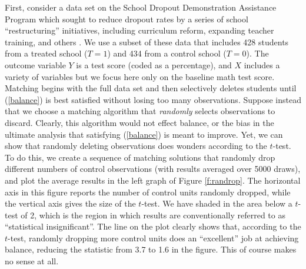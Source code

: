 \documentclass[11pt,titlepage]{article}
\begin{document}
First, consider a data set on the School Dropout Demonstration
Assistance Program which sought to reduce dropout rates by a series of
school ``restructuring'' initiatives, including curriculum reform,
expanding teacher training, and others \citep{AgoDyn04,Stuart04}.  We
use a subset of these data that includes 428 students from a treated
school ($T=1$) and 434 from a control school ($T=0$).  The outcome
variable $Y$ is a test score (coded as a percentage), and $X$ includes
a variety of variables but we focus here only on the baseline math
test score.  Matching begins with the full data set and then
selectively deletes students until (\ref{balance}) is best satisfied
without losing too many observations.  Suppose instead that we choose
a matching algorithm that \emph{randomly} selects observations to
discard.  Clearly, this algorithm would not effect balance, or the
bias in the ultimate analysis that satisfying (\ref{balance}) is meant
to improve.  Yet, we can show that randomly deleting observations does
wonders according to the $t$-test.  To do this, we create a sequence
of matching solutions that randomly drop different numbers of control
observations (with results averaged over 5000 draws), and plot the
average results in the left graph of Figure \ref{f:randrop}.  The
horizontal axis in this figure reports the number of control units
randomly dropped, while the vertical axis gives the size of the
$t$-test.  We have shaded in the area below a $t$-test of 2, which is
the region in which results are conventionally referred to as
``statistical insignificant''.  The line on the plot clearly shows
that, according to the $t$-test, randomly dropping more control units
does an ``excellent'' job at achieving balance, reducing the statistic
from 3.7 to 1.6 in the figure.  This of course makes no sense at all.
\end{document}
